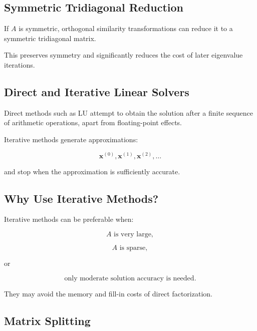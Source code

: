 \subsection{Symmetric Tridiagonal Reduction}
\label{subsec:symmetric-tridiagonal-reduction}

If \(A\) is symmetric, orthogonal similarity transformations can reduce it
to a symmetric tridiagonal matrix.

This preserves symmetry and significantly reduces the cost of later
eigenvalue iterations.

\subsection{Direct and Iterative Linear Solvers}
\label{subsec:direct-versus-iterative-linear-solvers}

Direct methods such as LU attempt to obtain the solution after a finite
sequence of arithmetic operations, apart from floating-point effects.

Iterative methods generate approximations:

\[
\boxed{
\mathbf{x}^{(0)},
\mathbf{x}^{(1)},
\mathbf{x}^{(2)},
\ldots
}
\]

and stop when the approximation is sufficiently accurate.

\subsection{Why Use Iterative Methods?}
\label{subsec:why-iterative-linear-solvers}

Iterative methods can be preferable when:

\[
\boxed{
A
\text{ is very large},
}
\]

\[
\boxed{
A
\text{ is sparse},
}
\]

or

\[
\boxed{
\text{only moderate solution accuracy is needed}.
}
\]

They may avoid the memory and fill-in costs of direct factorization.

\subsection{Matrix Splitting}
\label{subsec:matrix-splitting}

